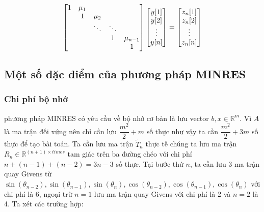 \documentclass[14pt, a4paper]{article}
\numberwithin{equation}{section}
\numberwithin{algorithm}{section}
\numberwithin{figure}{section}
\numberwithin{dl}{section}
\numberwithin{md}{section}
\numberwithin{bd}{section}
\numberwithin{dn}{section}
\begin{document}
\begin{equation} \label{eq:L-Backward-Substitution}
    \begin{bmatrix} 1 & \mu_1 & \thickspace & \thickspace & \thickspace \\
        \thickspace & 1 & \mu_2 & \thickspace & \thickspace \\
        \thickspace & \thickspace & \ddots & \ddots & \thickspace \\
        \thickspace & \thickspace & \thickspace & 1 & \mu_{n-1} \\
        \thickspace & \thickspace & \thickspace & \thickspace & 1 \end{bmatrix} \begin{bmatrix} y \lbrack 1 \rbrack \\ y \lbrack 2 \rbrack \\ \vdots \\ y \lbrack n \rbrack \end{bmatrix} = \begin{bmatrix} z_n \lbrack 1 \rbrack \\ z_n \lbrack 2 \rbrack \\ \vdots \\ z_n \lbrack n \rbrack \end{bmatrix}
\end{equation}
\subsection{Một số đặc điểm của phương pháp MINRES}

\subsubsection{Chi phí bộ nhớ} \label{MINRES-Storage}

phương pháp MINRES có yêu cầu về bộ nhớ cơ bản là lưu vector $b, x \in \mathbb{R}^m$. Vì $A$ là ma trận đối xứng nên chỉ cần lưu $\dfrac{m^2}{2} + m$ số thực như vậy ta cần $\dfrac{m^2}{2} + 3m$ số thực để tạo bài toán.
Ta cần lưu ma trận $\widetilde{T}_n$ thực tế chúng ta lưu ma trận $R_n \in \mathbb{R}^{(n+1) \times times}$ tam giác trên ba đường chéo với chi phí $n+(n-1) + (n-2)=3n-3$ số thực. Tại bước thứ $n$, ta cần lưu 3 ma trận quay Givens từ $\sin(\theta_{n-2}), \sin(\theta_{n-1}), \sin(\theta_n), \cos(\theta_{n-2}), \cos(\theta_{n-1}), \cos(\theta_n)$ với chi phí là 6, ngoại trừ $n=1$ lưu ma trận quay Givens với chi phí là 2 và $n=2$ là 4.
Ta xét các trường hợp:
\end{document}
